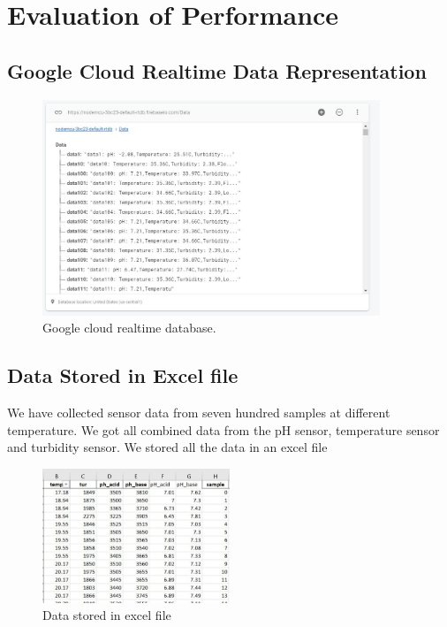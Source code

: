 

\section{Evaluation of Performance}

\subsection{Google Cloud Realtime Data Representation}

\begin{figure}[H]
\centering
\includegraphics[width=0.9\textwidth]{figures/database.JPG}
\caption{Google cloud realtime database.}
\label{sample}
\end{figure}

\subsection{Data Stored in Excel file}
We have collected sensor data from seven hundred samples at different temperature. We got all combined data from the pH sensor, temperature sensor and turbidity sensor. We stored all the data in an excel file 

\begin{figure}[H]
\centering
\includegraphics[width=0.5\textwidth]{figures/excel_data.JPG}
\caption{Data stored in excel file}
\label{sample}
\end{figure}

